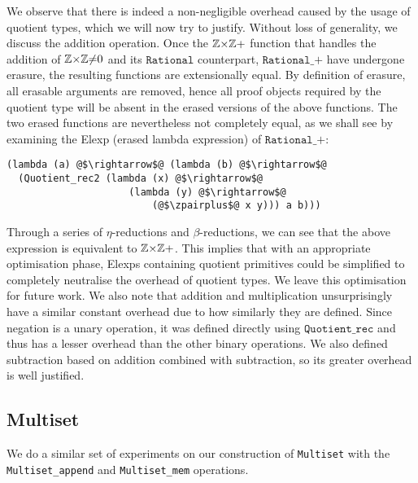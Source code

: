 \documentclass[12pt,twoside,maitrise]{dms}
\theoremstyle{definition}
\numberwithin{equation}{section}
\numberwithin{table}{chapter}
\numberwithin{figure}{chapter}
\newcommand\id[1] {\texttt{#1}}
\newcommand\fn[1] {\texttt{#1}}
\begin{document}
We observe that there is indeed a non-negligible overhead caused by the usage of
quotient types, which we will now try to justify. Without loss of generality, we
discuss the addition operation. Once the $\mathbb{Z}{\times}\mathbb{Z}+$ function that handles the
addition of $\mathbb{Z}{\times}\mathbb{Z}{\ne}0$ and its $\fn{Rational}$ counterpart, $\fn{Rational\_+}$
have undergone erasure, the resulting functions are extensionally equal. By
definition of erasure\cite{monnier2019typer}, all erasable arguments are
removed, hence all proof objects required by the quotient type will be absent in
the erased versions of the above functions. The two erased functions are
nevertheless not completely equal, as we shall see by examining the Elexp
(erased lambda expression)\cite{delaunay2017implementation} of
$\fn{Rational\_+}$:

\begin{verbatim}
(lambda (a) @$\rightarrow$@ (lambda (b) @$\rightarrow$@
  (Quotient_rec2 (lambda (x) @$\rightarrow$@
                     (lambda (y) @$\rightarrow$@
                         (@$\zpairplus$@ x y))) a b)))
\end{verbatim}

Through a series of $\eta$-reductions and $\beta$-reductions, we can see that
the above expression is equivalent to $\mathbb{Z}{\times}\mathbb{Z}+$. This implies that with an
appropriate optimisation phase, Elexps containing quotient primitives could be
simplified to completely neutralise the overhead of quotient types. We leave
this optimisation for future work. We also note that addition and
multiplication unsurprisingly have a similar constant overhead due to how
similarly they are defined. Since negation is a unary operation, it
was defined directly using $\fn{Quotient\_rec}$ and thus has a lesser overhead
than the other binary operations. We also defined subtraction based on
addition combined with subtraction, so its greater overhead is well justified.

\subsection*{Multiset}

We do a similar set of experiments on our construction of \id{Multiset} with the
\id{Multiset\_append} and \id{Multiset\_mem} operations.
\end{document}

